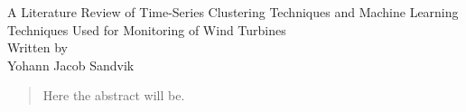 \documentclass[11pt,english,a4paper,openright]{report} %
\begin{document}
\setlength\parindent{0pt} %

\pagestyle{fancy}

\begin{titlepage}
    \centering
    
    {\LARGE A Literature Review of Time-Series Clustering Techniques and Machine Learning Techniques Used for Monitoring of Wind Turbines} \\ [\baselineskip]
    
    {\Large Written by} \\ 
    {\Large Yohann  Jacob Sandvik } \\

    \begin{abstract}
        Here the abstract will be.
    \end{abstract}

\end{titlepage}

\fancyhf{}

\tableofcontents
\newpage













\printbibliography
\end{document}
